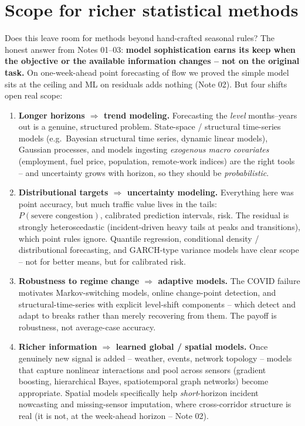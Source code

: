 \documentclass[11pt]{article}
\begin{document}
\section{Scope for richer statistical methods}
\label{sec:scope}
Does this leave room for methods beyond hand-crafted seasonal rules? The honest
answer from Notes 01--03: \textbf{model sophistication earns its keep when the
objective or the available information changes -- not on the original task.} On
one-week-ahead point forecasting of flow we proved the simple model sits at the
ceiling and ML on residuals adds nothing (Note 02). But four shifts open real
scope:

\begin{enumerate}
\item \textbf{Longer horizons $\Rightarrow$ trend modeling.} Forecasting the
  \emph{level} months--years out is a genuine, structured problem. State-space /
  structural time-series models (e.g.\ Bayesian structural time series, dynamic
  linear models), Gaussian processes, and models ingesting \emph{exogenous macro
  covariates} (employment, fuel price, population, remote-work indices) are the
  right tools -- and uncertainty grows with horizon, so they should be
  \emph{probabilistic}.
\item \textbf{Distributional targets $\Rightarrow$ uncertainty modeling.}
  Everything here was point accuracy, but much traffic value lives in the tails:
  $P(\text{severe congestion})$, calibrated prediction intervals, risk. The
  residual is strongly heteroscedastic (incident-driven heavy tails at peaks and
  transitions), which point rules ignore. Quantile regression, conditional
  density / distributional forecasting, and GARCH-type variance models have clear
  scope -- not for better means, but for calibrated risk.
\item \textbf{Robustness to regime change $\Rightarrow$ adaptive models.} The
  COVID failure motivates Markov-switching models, online change-point detection,
  and structural-time-series with explicit level-shift components -- which detect
  and adapt to breaks rather than merely recovering from them. The payoff is
  robustness, not average-case accuracy.
\item \textbf{Richer information $\Rightarrow$ learned global / spatial models.}
  Once genuinely new signal is added -- weather, events, network topology --
  models that capture nonlinear interactions and pool across sensors (gradient
  boosting, hierarchical Bayes, spatiotemporal graph networks) become
  appropriate. Spatial models specifically help \emph{short}-horizon incident
  nowcasting and missing-sensor imputation, where cross-corridor structure is
  real (it is not, at the week-ahead horizon -- Note 02).
\end{enumerate}
\end{document}
